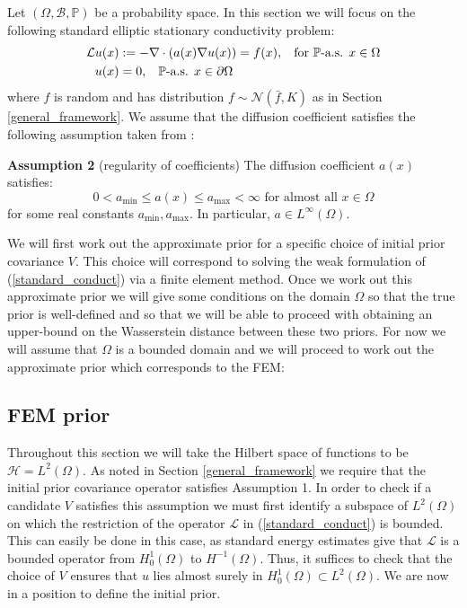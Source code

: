 Let $(\Omega,\mathcal{B},\mathbb{P})$ be a probability space. In this section we will focus on the following standard elliptic stationary conductivity problem:
\begin{align}
    \label{standard_conduct}
    \begin{split}
        \mathcal{L}u(x) &:= -\nabla\cdot(a(x)\nabla u(x))=f(x), \hspace{0.3cm} \text{for } \mathbb{P}\text{-a.s. } x\in\Omega \\
        u(x) &= 0, \hspace{0.3cm} \mathbb{P}\text{-a.s. } x\in\partial\Omega
    \end{split}
\end{align}
where $f$ is random and has distribution $f\sim\mathcal{N}(\bar{f},K)$ as in Section \textcolor{blue}{\ref{general_framework}}. We assume that the diffusion coefficient satisfies the following assumption taken from \textcolor{blue}{\citep{lord2014introduction}}:

\noindent \textbf{Assumption 2} (regularity of coefficients) The diffusion coefficient $a(x)$ satisfies:
\begin{equation}
    \label{regularity_of_coeff}
    0<a_{\text{min}}\leq a(x)\leq a_{\text{max}}<\infty \text{ for almost all } x\in\Omega
\end{equation}
for some real constants $a_{\text{min}},a_{\text{max}}$. In particular, $a\in L^{\infty}(\Omega)$.

We will first work out the approximate prior for a specific choice of initial prior covariance $V$. This choice will correspond to solving the weak formulation of (\ref{standard_conduct}) via a finite element method. Once we work out this approximate prior we will give some conditions on the domain $\Omega$ so that the true prior is well-defined and so that we will be able to proceed with obtaining an upper-bound on the Wasserstein distance between these two priors. For now we will assume that $\Omega$ is a bounded domain and we will proceed to work out the approximate prior which corresponds to the FEM:

\subsection{FEM prior}

Throughout this section we will take the Hilbert space of functions to be $\mathcal{H}=L^{2}(\Omega)$. As noted in Section \textcolor{blue}{\ref{general_framework}} we require that the initial prior covariance operator satisfies Assumption 1. In order to check if a candidate $V$ satisfies this assumption we must first identify a subspace of $L^{2}(\Omega)$ on which the restriction of the operator $\mathcal{L}$ in (\ref{standard_conduct}) is bounded. This can easily be done in this case, as standard energy estimates give that $\mathcal{L}$ is a bounded operator from $H^{1}_{0}(\Omega)$ to $H^{-1}(\Omega)$. Thus, it suffices to check that the choice of $V$ ensures that $u$ lies almost surely in $H_{0}^{1}(\Omega)\subset L^{2}(\Omega)$. We are now in a position to define the initial prior.

